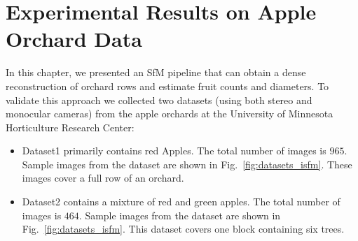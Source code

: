 \section{Experimental Results on Apple Orchard Data }\label{sec:experiments}
In this chapter, we presented an SfM pipeline that can obtain a dense reconstruction of orchard rows and estimate fruit counts and diameters. To validate this approach we collected two datasets (using both stereo and monocular cameras) from the apple orchards at the University of Minnesota Horticulture Research Center: 
\begin{itemize}
\item Dataset1 primarily contains red Apples. The total number of images is $965$. Sample images from the dataset are shown in Fig.~\ref{fig:datasets_isfm}. These images cover a full row of an orchard.
\item Dataset2 contains a mixture of red and green apples. The total number of images is $464$. Sample images from the dataset are shown in Fig.~\ref{fig:datasets_isfm}. This dataset covers one block containing six trees.
\end{itemize}


